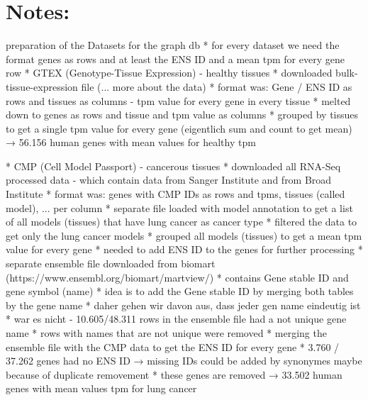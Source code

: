 \documentclass[11pt,a4paper]{article}
\begin{document}
\section{Notes:}
{\color{lightgray}

preparation of the Datasets for the graph db
* for every dataset we need the format genes as rows and at least the ENS ID and a mean tpm for every gene row
    * GTEX (Genotype-Tissue Expression) - healthy tissues
        * downloaded bulk-tissue-expression file (... more about the data)
        * format was: Gene / ENS ID as rows and tissues as columns - tpm value for every gene in every tissue
        * melted down to genes as rows and tissue and tpm value as columns
        * grouped by tissues to get a single tpm value for every gene (eigentlich sum and count to get mean)
    → 56.156 human genes with mean values for healthy tpm

    * CMP (Cell Model Passport) - cancerous tissues
        * downloaded all RNA-Seq processed data - which contain data from Sanger Institute and from Broad Institute
        * format was: genes with CMP IDs as rows and tpms, tissues (called model), ... per column
        * separate file loaded with model annotation to get a list of all models (tissues) that have lung cancer as cancer type
        * filtered the data to get only the lung cancer models
        * grouped all models (tissues) to get a mean tpm value for every gene
        * needed to add ENS ID to the genes for further processing
        * separate ensemble file downloaded from biomart (https://www.ensembl.org/biomart/martview/)
        * contains Gene stable ID and gene symbol (name)
        * idea is to add the Gene stable ID by merging both tables by the gene name
        * daher gehen wir davon aus, dass jeder gen name eindeutig ist
        * war es nicht - 10.605/48.311 rows in the ensemble file had a not unique gene name
        * rows with names that are not unique were removed
        * merging the ensemble file with the CMP data to get the ENS ID for every gene
        * 3.760 / 37.262 genes had no ENS ID → missing IDs could be added by synonymes maybe because of duplicate removement
        * these genes are removed
    → 33.502 human genes with mean values tpm for lung cancer

}
\end{document}
